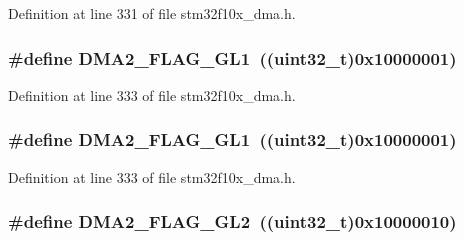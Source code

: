 Definition at line 331 of file stm32f10x\+\_\+dma.\+h.

\subsubsection[{\texorpdfstring{D\+M\+A2\+\_\+\+F\+L\+A\+G\+\_\+\+G\+L1}{DMA2_FLAG_GL1}}]{\setlength{\rightskip}{0pt plus 5cm}\#define D\+M\+A2\+\_\+\+F\+L\+A\+G\+\_\+\+G\+L1~(({\bf uint32\+\_\+t})0x10000001)}\hypertarget{group___d_m_a__flags__definition_ga34b82697f14e2fa9f7abeb4c43502822}{}\label{group___d_m_a__flags__definition_ga34b82697f14e2fa9f7abeb4c43502822}


Definition at line 333 of file stm32f10x\+\_\+dma.\+h.

\subsubsection[{\texorpdfstring{D\+M\+A2\+\_\+\+F\+L\+A\+G\+\_\+\+G\+L1}{DMA2_FLAG_GL1}}]{\setlength{\rightskip}{0pt plus 5cm}\#define D\+M\+A2\+\_\+\+F\+L\+A\+G\+\_\+\+G\+L1~(({\bf uint32\+\_\+t})0x10000001)}\hypertarget{group___d_m_a__flags__definition_ga34b82697f14e2fa9f7abeb4c43502822}{}\label{group___d_m_a__flags__definition_ga34b82697f14e2fa9f7abeb4c43502822}


Definition at line 333 of file stm32f10x\+\_\+dma.\+h.

\subsubsection[{\texorpdfstring{D\+M\+A2\+\_\+\+F\+L\+A\+G\+\_\+\+G\+L2}{DMA2_FLAG_GL2}}]{\setlength{\rightskip}{0pt plus 5cm}\#define D\+M\+A2\+\_\+\+F\+L\+A\+G\+\_\+\+G\+L2~(({\bf uint32\+\_\+t})0x10000010)}\hypertarget{group___d_m_a__flags__definition_gaa646f1ffc4468931a748ecff6440d40f}{}\label{group___d_m_a__flags__definition_gaa646f1ffc4468931a748ecff6440d40f}


